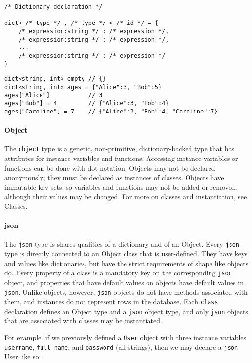 \documentclass[]{article}
\begin{document}
\begin{verbatim}
/* Dictionary declaration */

dict< /* type */ , /* type */ > /* id */ = {
    /* expression:string */ : /* expression */,
    /* expression:string */ : /* expression */,
    ...
    /* expression:string */ : /* expression */
}
\end{verbatim}

\begin{verbatim}
dict<string, int> empty // {}
dict<string, int> ages = {"Alice":3, "Bob":5}
ages["Alice"]           // 3
ages["Bob"] = 4         // {"Alice":3, "Bob":4}
ages["Caroline"] = 7    // {"Alice":3, "Bob":4, "Caroline":7}
\end{verbatim}

\paragraph{Object}\label{object}

The \texttt{object} type is a generic, non-primitive, dictionary-backed
type that has attributes for instance variables and functions. Accessing
instance variables or functions can be done with dot notation. Objects
may not be declared anonymously; they must be declared as instances of
classes. Objects have immutable key sets, so variables and functions may
not be added or removed, although their values may be changed. For more
on classes and instantiation, see Classes.

\paragraph{json}\label{json}

The \texttt{json} type is shares qualities of a dictionary and of an
Object. Every \texttt{json} type is directly connected to an Object
class that is user-defined. They have keys and values like dictionaries,
but have the strict requirements of shape like objects do. Every
property of a class is a mandatory key on the corresponding
\texttt{json} object, and properties that have default values on objects
have default values in \texttt{json}. Unlike objects, however,
\texttt{json} objects do not have methods associated with them, and
instances do not represent rows in the database. Each \texttt{class}
declaration defines an Object type and a \texttt{json} object type, and
only \texttt{json} objects that are associated with classes may be
instantiated.

For example, if we previously defined a \texttt{User} object with three
instance variables \texttt{username}, \texttt{full\_name}, and
\texttt{password} (all strings), then we may declare a \texttt{json}
User like so:
\end{document}
